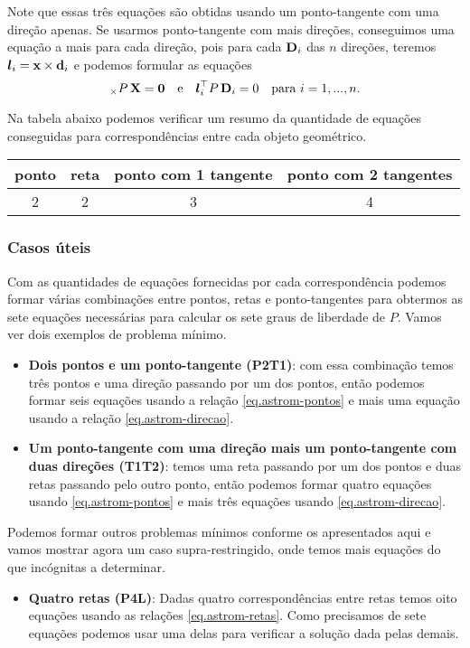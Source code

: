Note que essas três equações são obtidas usando um ponto-tangente com uma direção apenas. Se usarmos ponto-tangente com mais direções, conseguimos uma equação a mais para cada direção, pois para cada ${\bf D}_i$ das $n$ direções, teremos $\boldsymbol{l}_i=\mathbf{x}\times{\bf d}_i$ e podemos formular as equações
\begin{equation}
[\x]_\times P\,\X={\bf 0}\quad\text{e}\quad\lightrgb_i^\top P\,{\bf D}_i=0\quad\text{para}\,\,i=1,...,n.
\end{equation}

Na tabela abaixo podemos verificar um resumo da quantidade de equações conseguidas para correspondências entre cada objeto geométrico.
\begin{center}
\begin{tabular}{|c|c|c|c|}
\hline 
ponto & reta & ponto com 1 tangente & ponto com 2 tangentes \\ 
\hline 
2 & 2 & 3 & 4 \\ 
\hline 
\end{tabular} 
\end{center}

\subsubsection*{Casos úteis}

Com as quantidades de equações fornecidas por cada correspondência podemos formar várias combinações entre pontos, retas e ponto-tangentes para obtermos as sete equações necessárias para calcular os sete graus de liberdade de $P$. Vamos ver dois exemplos de problema mínimo.
\begin{itemize}
\item {\bf Dois pontos e um ponto-tangente (P2T1)}: com essa combinação temos três pontos e uma direção passando por um dos pontos, então podemos formar seis equações usando a relação \ref{eq.astrom-pontos} e mais uma equação usando a relação \ref{eq.astrom-direcao}. 

\item {\bf Um ponto-tangente com uma direção mais um ponto-tangente com duas direções (T1T2)}: temos uma reta passando por um dos pontos e duas retas passando pelo outro ponto, então podemos formar quatro equações usando \ref{eq.astrom-pontos} e mais três equações usando \ref{eq.astrom-direcao}.
\end{itemize} 

Podemos formar outros problemas mínimos conforme os apresentados aqui e vamos mostrar agora um caso supra-restringido, onde temos mais equações do que incógnitas a determinar.
\begin{itemize}
\item {\bf Quatro retas (P4L)}: Dadas quatro correspondências entre retas temos oito equações usando as relações \ref{eq.astrom-retas}. Como precisamos de sete equações podemos usar uma delas para verificar a solução dada pelas demais.
\end{itemize}

